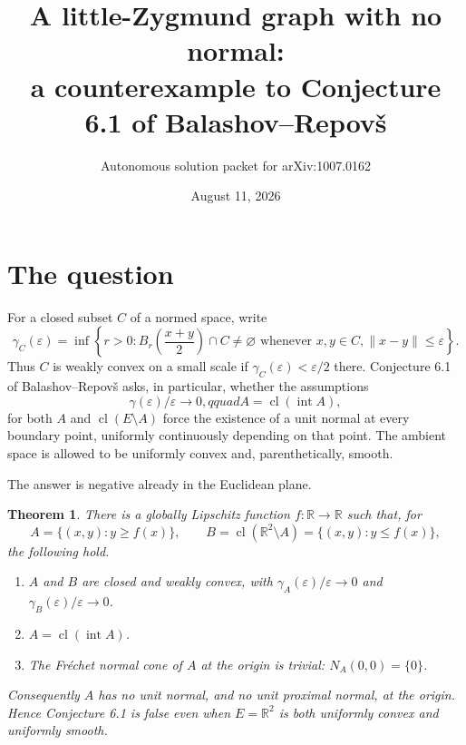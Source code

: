 \documentclass[11pt]{article}
\title{A little-Zygmund graph with no normal:\\
a counterexample to Conjecture 6.1 of Balashov--Repov\v{s}}
\author{Autonomous solution packet for arXiv:1007.0162}
\date{August 11, 2026}
\newtheorem{theorem}{Theorem}
\newcommand{\R}{\mathbb R}
\newcommand{\cl}{\operatorname{cl}}
\begin{document}
\maketitle

\begin{center}
\end{center}

\section{The question}

For a closed subset $C$ of a normed space, write
\[
 \gamma_C(\varepsilon)=
 \inf\left\{r>0:
 B_r\!\left(\frac{x+y}{2}\right)\cap C\ne\varnothing
 \text{ whenever }x,y\in C, \|x-y\|\leq\varepsilon\right\}.
\]
Thus $C$ is weakly convex on a small scale if
$\gamma_C(\varepsilon)<\varepsilon/2$ there.  Conjecture 6.1 of
Balashov--Repov\v{s} asks, in particular, whether the assumptions
\[
 \gamma(\varepsilon)/\varepsilon\longrightarrow0,qquad
 A=\cl(\operatorname{int}A),
\]
for both $A$ and $\cl(E\setminus A)$ force the existence of a unit normal at
every boundary point, uniformly continuously depending on that point.  The
ambient space is allowed to be uniformly convex and, parenthetically, smooth.

The answer is negative already in the Euclidean plane.

\begin{theorem}\label{thm:main}
There is a globally Lipschitz function $f:\R\to\R$ such that, for
\[
 A=\{(x,y):y\geq f(x)\},\qquad
 B=\cl(\R^2\setminus A)=\{(x,y):y\leq f(x)\},
\]
the following hold.
\begin{enumerate}
 \item $A$ and $B$ are closed and weakly convex, with
 $\gamma_A(\varepsilon)/\varepsilon\to0$ and
 $\gamma_B(\varepsilon)/\varepsilon\to0$.
 \item $A=\cl(\operatorname{int}A)$.
 \item The Fr\'echet normal cone of $A$ at the origin is trivial:
 $N_A(0,0)=\{0\}$.
\end{enumerate}
Consequently $A$ has no unit normal, and no unit proximal normal, at the
origin.  Hence Conjecture 6.1 is false even when $E=\R^2$ is both uniformly
convex and uniformly smooth.
\end{theorem}
\end{document}
